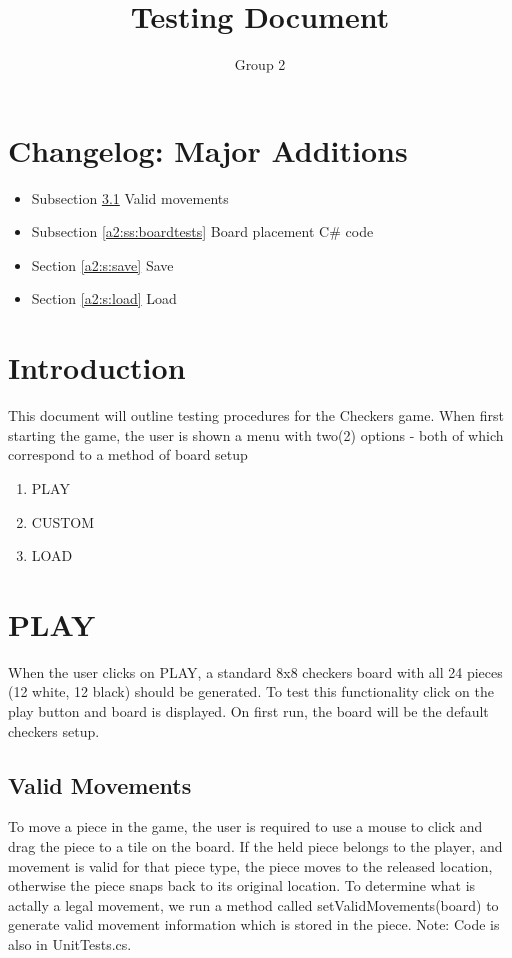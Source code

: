 \documentclass{article}
\title{\bf Testing Document}
\author{Group 2}
\date{\vspace{-5ex}}
\begin{document}
\maketitle
\tableofcontents

\section{Changelog: Major Additions}
\begin{itemize}
\item Subsection \ref{a2:ss:valid} Valid movements
\item Subsection \ref{a2:ss:boardtests} Board placement C\# code
\item Section \ref{a2:s:save} Save
\item Section \ref{a2:s:load} Load
\end{itemize}


\section{Introduction}
This document will outline testing procedures for the Checkers game. When first starting the game, the user is shown a menu with two(2) options - both of which correspond to a method of board setup 
\begin{enumerate}
\item PLAY
\item CUSTOM
\item LOAD
\end{enumerate}

\section{PLAY}
When the user clicks on PLAY, a standard 8x8 checkers board with all 24 pieces (12 white, 12 black) should be generated.
To test this functionality click on the play button and board is displayed. On first run, the board will be the default checkers setup.

\subsection{Valid Movements} \label{a2:ss:valid}
To move a piece in the game, the user is required to use a mouse to click and drag the piece to a tile on the board.
If the held piece belongs to the player, and movement is valid for that piece type, the piece moves to the released location, otherwise the piece snaps back to its original location.
To determine what is actally a legal movement, we run a method called setValidMovements(board) to generate valid movement information which is stored in the piece.
Note: Code is also in UnitTests.cs.
\end{document}
